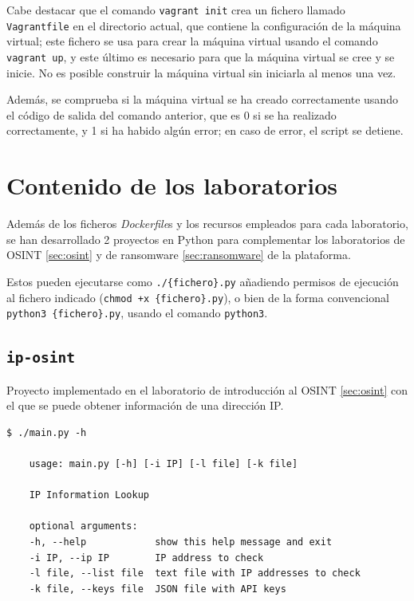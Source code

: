                Cabe destacar que el comando \texttt{vagrant init} crea un fichero llamado \texttt{Vagrantfile} en el directorio actual, que contiene la configuración de la máquina virtual; este fichero se usa para crear la máquina virtual usando el comando \texttt{vagrant up}, y este último es necesario para que la máquina virtual se cree y se inicie. No es posible construir la máquina virtual sin iniciarla al menos una vez.

                Además, se comprueba si la máquina virtual se ha creado correctamente usando el código de salida del comando anterior, que es 0 si se ha realizado correctamente, y 1 si ha habido algún error; en caso de error, el script se detiene.

                \newpage


    \section{Contenido de los laboratorios}

        Además de los ficheros \textit{Dockerfile}s y los recursos empleados para cada laboratorio, se han desarrollado 2 proyectos en Python para complementar los laboratorios de OSINT \ref{sec:osint} y de ransomware \ref{sec:ransomware} de la plataforma.

        Estos pueden ejecutarse como \texttt{./\{fichero\}.py} añadiendo permisos de ejecución al fichero indicado (\texttt{chmod +x \{fichero\}.py}), o bien de la forma convencional \texttt{python3 \{fichero\}.py}, usando el comando \texttt{python3}.

        \subsection{\texttt{ip-osint}}
            \label{sec:ip-osint}

            Proyecto implementado en el laboratorio de introducción al OSINT \ref{sec:osint} con el que se puede obtener información de una dirección IP.
            \\

            \begin{lstlisting}[style=bash_style, caption={Menú de ayuda del proyecto}]
    $ ./main.py -h
    
    usage: main.py [-h] [-i IP] [-l file] [-k file]

    IP Information Lookup

    optional arguments:
    -h, --help            show this help message and exit
    -i IP, --ip IP        IP address to check
    -l file, --list file  text file with IP addresses to check
    -k file, --keys file  JSON file with API keys
            \end{lstlisting}

